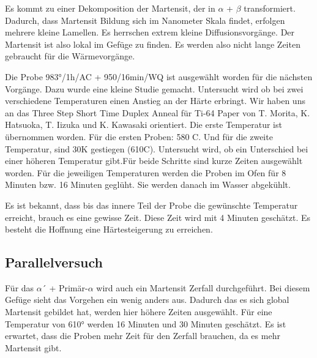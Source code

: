 Es kommt zu einer Dekomposition der Martensit, der in $\alpha$ + $\beta$ transformiert. Dadurch, dass Martensit Bildung sich im Nanometer Skala findet, erfolgen mehrere kleine Lamellen. Es herrschen extrem kleine Diffusionsvorgänge. Der Martensit ist also lokal im Gefüge zu finden. Es werden also nicht lange Zeiten gebraucht für die Wärmevorgänge.

Die Probe 983°/1h/AC + 950/16min/WQ ist ausgewählt worden für die nächsten Vorgänge. Dazu wurde eine kleine Studie gemacht. Untersucht wird ob bei zwei verschiedene Temperaturen einen Anstieg an der Härte erbringt. Wir haben uns an das Three Step Short Time Duplex Anneal für Ti-64 Paper von T. Morita, K. Hatsuoka, T. Iizuka und K. Kawasaki orientiert. Die erste Temperatur ist übernommen worden. Für die ersten Proben: 580 C. Und für die zweite Temperatur, sind 30K gestiegen (610C). Untersucht wird, ob ein Unterschied bei einer höheren Temperatur gibt.Für beide Schritte sind kurze Zeiten ausgewählt worden. Für die jeweiligen Temperaturen werden die Proben im Ofen für 8 Minuten bzw. 16 Minuten geglüht. Sie werden danach im Wasser abgekühlt. 

Es ist bekannt, dass bis das innere Teil der Probe die gewünschte Temperatur erreicht, brauch es eine gewisse Zeit. Diese Zeit wird mit 4 Minuten geschätzt. Es besteht die Hoffnung eine Härtesteigerung zu erreichen.



\subsection{Parallelversuch}

Für das $\alpha$´ + Primär-$\alpha$ wird auch ein Martensit Zerfall durchgeführt. Bei diesem Gefüge sieht das Vorgehen ein wenig anders aus. Dadurch das es sich global Martensit gebildet hat, werden hier höhere Zeiten ausgewählt. Für eine Temperatur von 610° werden 16 Minuten und 30 Minuten geschätzt. Es ist erwartet, dass die Proben mehr Zeit für den Zerfall brauchen, da es mehr Martensit gibt. 

